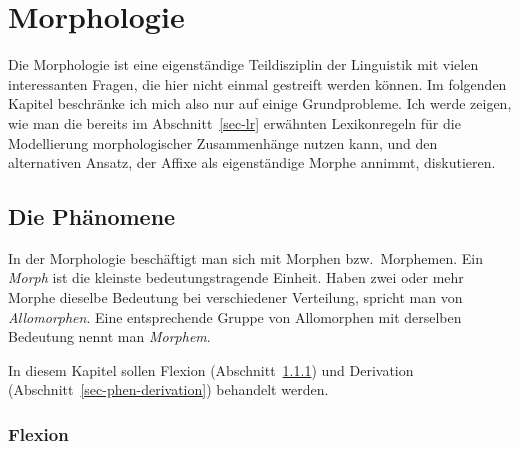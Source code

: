 


\chapter{Morphologie}
\label{Kapitel-morphologie}
\label{Kapitel-Morphologie}

Die Morphologie ist eine eigenständige Teildisziplin der Linguistik mit vielen interessanten
Fragen, die hier nicht einmal gestreift werden können. Im folgenden Kapitel beschränke ich
mich also nur auf einige Grundprobleme. Ich werde zeigen, wie man die bereits im Abschnitt~\ref{sec-lr}
erwähnten Lexikonregeln für die Modellierung morphologischer Zusammenhänge nutzen kann, und den alternativen Ansatz, der Affixe als eigenständige
Morphe annimmt, diskutieren.
\largerpage

\section{Die Phänomene}

In der Morphologie beschäftigt man sich mit Morphen bzw.\ Morphemen. Ein \emph{Morph} ist
die kleinste bedeutungstragende Einheit. Haben zwei oder mehr Morphe dieselbe Bedeutung
bei verschiedener Verteilung, spricht man von \emph{Allomorphen}. Eine entsprechende Gruppe
von Allomorphen mit derselben Bedeutung nennt man \emph{Morphem}. 

In diesem Kapitel sollen Flexion (Abschnitt~\ref{sec-phen-flexion})
und Derivation (Abschnitt~\ref{sec-phen-derivation}) behandelt werden.

\subsection{Flexion}
\label{sec-phen-flexion}


